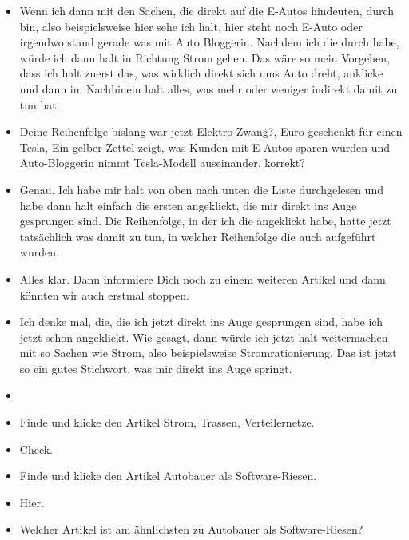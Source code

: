 {\begin{itemize}[]
            \item {} Wenn ich dann mit den Sachen, die direkt auf die E-Autos hindeuten, durch bin, also beispielsweise hier sehe ich halt, hier steht noch E-Auto oder irgendwo stand gerade was mit Auto Bloggerin.
                  Nachdem ich die durch habe, würde ich dann halt in Richtung Strom gehen.
                  Das wäre so mein Vorgehen, dass ich halt zuerst das, was wirklich direkt sich ums Auto dreht, anklicke und dann im Nachhinein halt alles, was mehr oder weniger indirekt damit zu tun hat.
            \item {} Deine Reihenfolge bislang war jetzt \flqq Elektro-Zwang?\frqq{},  Euro geschenkt für einen Tesla\frqq{}, \flqq Ein gelber Zettel zeigt, was Kunden mit E-Autos sparen würden\frqq{} und \flqq Auto-Bloggerin nimmt Tesla-Modell auseinander\frqq{}, korrekt?
            \item {} Genau.
                  Ich habe mir halt von oben nach unten die Liste durchgelesen und habe dann halt einfach die ersten angeklickt, die mir direkt ins Auge gesprungen sind.
                  Die Reihenfolge, in der ich die angeklickt habe, hatte jetzt tatsächlich was damit zu tun, in welcher Reihenfolge die auch aufgeführt wurden.
            \item {} Alles klar. Dann informiere Dich noch zu einem weiteren Artikel und dann könnten wir auch erstmal stoppen.
            \item {} Ich denke mal, die, die ich jetzt direkt ins Auge gesprungen sind, habe ich jetzt schon angeklickt.
                  Wie gesagt, dann würde ich jetzt halt weitermachen mit so Sachen wie Strom, also beispielsweise \flqq Stromrationierung\frqq{}.
                  Das ist jetzt so ein gutes Stichwort, was mir direkt ins Auge springt.
            \item {}
            \item {} Finde und klicke den Artikel \flqq Strom, Trassen, Verteilernetze\frqq{}.
            \item {} Check.
            \item {} Finde und klicke den Artikel \flqq Autobauer als Software-Riesen\frqq{}.
            \item {} Hier.
            \item {} Welcher Artikel ist am ähnlichsten zu \flqq Autobauer als Software-Riesen\frqq{}?

\end{itemize}}
